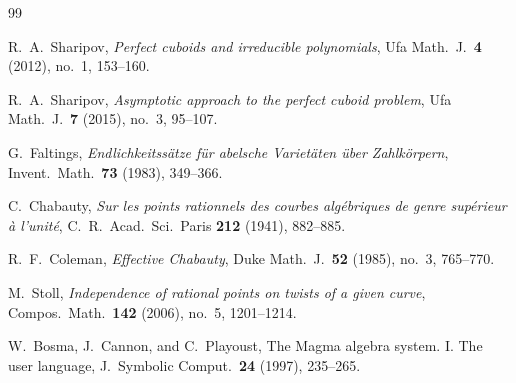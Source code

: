 \documentclass[12pt]{article}
\theoremstyle{remark}
\theoremstyle{definition}
\begin{document}
\begingroup
\footnotesize
\begin{thebibliography}{99}

R.~A.~Sharipov,
\newblock \emph{Perfect cuboids and irreducible polynomials},
\newblock Ufa Math.\ J.\ \textbf{4} (2012), no.~1, 153--160.

R.~A.~Sharipov,
\newblock \emph{Asymptotic approach to the perfect cuboid problem},
\newblock Ufa Math.\ J.\ \textbf{7} (2015), no.~3, 95--107.

G.~Faltings,
\newblock \emph{Endlichkeitss\"atze f\"ur abelsche Variet\"aten \"uber Zahlk\"orpern},
\newblock Invent.\ Math.\ \textbf{73} (1983), 349--366.

C.~Chabauty,
\newblock \emph{Sur les points rationnels des courbes alg\'ebriques de genre sup\'erieur \`a l'unit\'e},
\newblock C.\ R.\ Acad.\ Sci.\ Paris \textbf{212} (1941), 882--885.

R.~F.~Coleman,
\newblock \emph{Effective Chabauty},
\newblock Duke Math.\ J.\ \textbf{52} (1985), no.~3, 765--770.

M.~Stoll,
\newblock \emph{Independence of rational points on twists of a given curve},
\newblock Compos.\ Math.\ \textbf{142} (2006), no.~5, 1201--1214.

W.~Bosma, J.~Cannon, and C.~Playoust,
\newblock The Magma algebra system. {I}. The user language,
\newblock J.\ Symbolic Comput.\ \textbf{24} (1997), 235--265.

\end{thebibliography}
\endgroup
\end{document}
